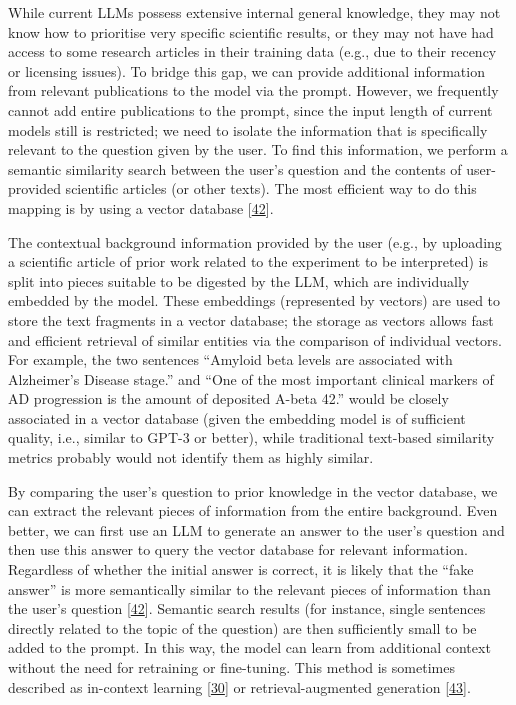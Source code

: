 While current LLMs possess extensive internal general knowledge, they may not know how to prioritise very specific scientific results, or they may not have had access to some research articles in their training data (e.g., due to their recency or licensing issues).
To bridge this gap, we can provide additional information from relevant publications to the model via the prompt.
However, we frequently cannot add entire publications to the prompt, since the input length of current models still is restricted; we need to isolate the information that is specifically relevant to the question given by the user.
To find this information, we perform a semantic similarity search between the user's question and the contents of user-provided scientific articles (or other texts).
The most efficient way to do this mapping is by using a vector database {[}\protect\hyperlink{ref-o6hUZE9J}{42}{]}.

The contextual background information provided by the user (e.g., by uploading a scientific article of prior work related to the experiment to be interpreted) is split into pieces suitable to be digested by the LLM, which are individually embedded by the model.
These embeddings (represented by vectors) are used to store the text fragments in a vector database; the storage as vectors allows fast and efficient retrieval of similar entities via the comparison of individual vectors.
For example, the two sentences ``Amyloid beta levels are associated with Alzheimer's Disease stage.'' and ``One of the most important clinical markers of AD progression is the amount of deposited A-beta 42.'' would be closely associated in a vector database (given the embedding model is of sufficient quality, i.e., similar to GPT-3 or better), while traditional text-based similarity metrics probably would not identify them as highly similar.

By comparing the user's question to prior knowledge in the vector database, we can extract the relevant pieces of information from the entire background.
Even better, we can first use an LLM to generate an answer to the user's question and then use this answer to query the vector database for relevant information.
Regardless of whether the initial answer is correct, it is likely that the ``fake answer'' is more semantically similar to the relevant pieces of information than the user's question {[}\protect\hyperlink{ref-o6hUZE9J}{42}{]}.
Semantic search results (for instance, single sentences directly related to the topic of the question) are then sufficiently small to be added to the prompt.
In this way, the model can learn from additional context without the need for retraining or fine-tuning.
This method is sometimes described as in-context learning {[}\protect\hyperlink{ref-1BzQcjRCZ}{30}{]} or retrieval-augmented generation {[}\protect\hyperlink{ref-aiaYUZ1t}{43}{]}.

